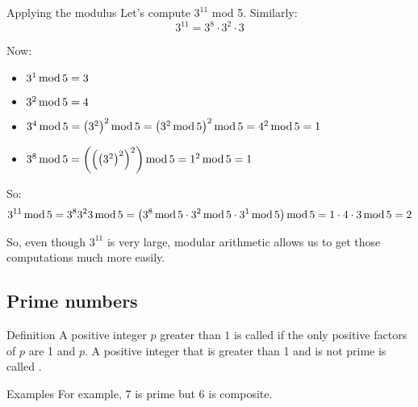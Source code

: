 \documentclass[a4paper]{article}
\begin{document}
\begin{parag}{Applying the modulus}
    Let's compute $3^{11}$ mod 5. Similarly:
    \[3^{11} = 3^{8}\cdot 3^2 \cdot 3\]
    
    Now: 
    \begin{itemize}
        \item $3^1 \operatorname{mod} 5 = 3$
        \item $3^2 \operatorname{mod} 5 = 4$
        \item $3^4 \Mod 5 = \left(3^2\right)^2 \Mod 5 = \left(3^2 \Mod 5\right)^2 \Mod 5 = 4^2 \Mod 5 = 1$
        \item $3^8 \Mod 5 = \left(\left(\left(3^2\right)^2\right)^2\right) \Mod 5 = 1^2 \Mod 5 = 1$
    \end{itemize}
    
    So: 
    \[3^{11} \Mod 5 = 3^{8} 3^2 3 \Mod 5 = \left(3^8 \Mod 5 \cdot 3^2 \Mod 5 \cdot 3^1 \Mod 5\right) \Mod 5 = 1 \cdot 4 \cdot 3 \Mod 5 = 2\]

    So, even though $3^{11}$ is very large, modular arithmetic allows us to get those computations much more easily. 
\end{parag}

\subsection{Prime numbers}
\begin{parag}{Definition}
    A positive integer $p$ greater than $1$ is called  if the only positive factors of $p$ are 1 and $p$. A positive integer that is greater than 1 and is not prime is called .

    \begin{subparag}{Examples}
        For example, 7 is prime but 6 is composite.
    \end{subparag}
    
\end{parag}
\end{document}
